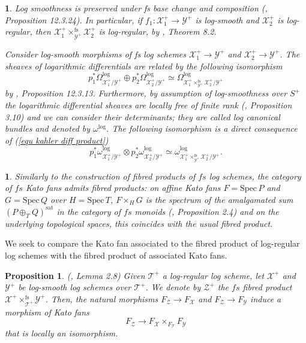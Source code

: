 \documentclass{amsart}%
\numberwithin{equation}{subsection}
\theoremstyle{plain2}
\newtheorem{prop}[equation]{Proposition}
\theoremstyle{definition2}
\theoremstyle{stepstyle}
\theoremstyle{point}
\theoremstyle{subpoint}
\newtheorem{subpoint}[equation]{}%
\newcommand{\spa}[1]{\begin{subpoint}#1\end{subpoint}}           %
\newcommand{\cX}{\ensuremath{\mathscr{X}}}
\newcommand{\cY}{\ensuremath{\mathscr{Y}}}
\newcommand{\cZ}{\ensuremath{\mathscr{Z}}}
\renewcommand{\cZ}{\ensuremath{\mathscr{Z}}}
\renewcommand{\cY}{\ensuremath{\mathscr{Y}}}
\newcommand{\Spec}{\ensuremath{\mathrm{Spec}\,}}
\begin{document}
\spa{Log smoothness is preserved under fs base change and composition (\cite{GabberRamero}, Proposition 12.3.24). In particular, if $f_1: \cX_1^+ \rightarrow \cY^+$ is log-smooth and $\cX_2^+$ is log-regular, then $\cX_1^+\times^{\text{fs}}_{\cY^+} \cX_2^+$ is log-regular, by \cite{Kato1994a}, Theorem 8.2.

Consider log-smooth morphisms of fs log schemes $\cX_1^+ \rightarrow \cY^+$ and $\cX_2^+ \rightarrow \cY^+$. The sheaves of logarithmic differentials are related by the following isomorphism \begin{equation} \label{equ kahler diff product}
p_1^* \Omega^{\log}_{\cX_1^+/\cY^+} \oplus p_2^* \Omega^{\log}_{\cX_2^+/ \cY^+} \simeq \Omega^{\log}_{\cX_1^+\times^{\text{fs}}_{\cY^+} \cX_2^+ /\cY^+}\end{equation} by \cite{GabberRamero}, Proposition 12.3.13. Furthermore, by assumption of log-smoothness over $S^+$ the logarithmic differential sheaves are locally free of finite rank (\cite{Kato1994a}, Proposition 3.10) and we can consider their determinants; they are called log canonical bundles and denoted by $\omega^{\log}$. The following isomorphism is a direct consequence of (\ref{equ kahler diff product}) \begin{equation} \label{equ log can bundles}
p_1^* \omega^{\log}_{\cX_1^+/\cY^+} \otimes p_2^* \omega^{\log}_{\cX_2^+/ \cY^+} \simeq \omega^{\log}_{\cX_1^+\times^{\text{fs}}_{\cY^+} \cX_2^+ /\cY^+}.\end{equation} }

\spa{Similarly to the construction of fibred products of $fs$ log schemes, the category of $fs$ Kato fans admits fibred products: on affine Kato fans $F=\Spec P$ and $G=\Spec Q$ over $H=\Spec T$, $F\times_{H}G$ is the spectrum of the amalgamated sum $(P \oplus_T Q)^{\text{sat}}$ in the category of $fs$ monoids (\cite{Ulirsch2016}, Proposition 2.4) and on the underlying topological spaces, this coincides with the usual fibred product.}
We seek to compare the Kato fan associated to the fibred product of log-regular log schemes with the fibred product of associated Kato fans.
\begin{prop} \label{local isomo kato fan product}(\cite{Saito2004}, Lemma 2.8) Given $\mathscr{T}^+$ a log-regular log scheme, let $\cX^+$ and $\cY^+$ be log-smooth log schemes over $\mathscr{T}^+$. We denote by $\cZ^+$ the $fs$ fibred product $\cX^+\times^{\text{fs}}_{\mathscr{T}^+} \cY^+$. Then, the natural morphisms $F_{\cZ}\to F_{\cX}$ and $F_{\cZ}\to F_{\cY}$ induce a morphism of Kato fans $$F_{\cZ} \rightarrow F_{\cX} \times_{F_{\mathscr{T}}} F_{\cY}$$ that is locally an isomorphism.
\end{prop}
\end{document}
